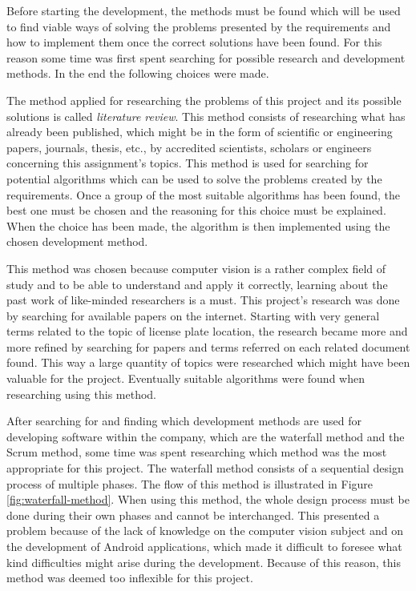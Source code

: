 
Before starting the development, the methods must be found which will be used to find viable ways of solving the problems presented by the requirements and how to implement them once the correct solutions have been found. For this reason some time was first spent searching for possible research and development methods. In the end the following choices were made.


The method applied for researching the problems of this project and its possible solutions is called \emph{literature review}. This method consists of researching what has already been published, which might be in the form of scientific or engineering papers, journals, thesis, etc., by accredited scientists, scholars or engineers concerning this assignment's topics. 
This method is used for searching for potential algorithms which can be used to solve the problems created by the requirements. Once a group of the most suitable algorithms has been found, the best one must be chosen and the reasoning for this choice must be explained. When the choice has been made, the algorithm is then implemented using the chosen development method.

This method was chosen because computer vision is a rather complex field of study and to be able to understand and apply it correctly, learning about the past work of like-minded researchers is a must. This project's research was done by searching for available papers on the internet. Starting with very general terms related to the topic of license plate location, the research became more and more refined by searching for papers and terms referred on each related document found. This way a large quantity of topics were researched which might have been valuable for the project. Eventually suitable algorithms were found when researching using this method.


After searching for and finding which development methods are used for developing software within the company, which are the waterfall method and the Scrum method, some time was spent researching which method was the most appropriate for this project. The waterfall method consists of a sequential design process of multiple phases. The flow of this method is illustrated in Figure \ref{fig:waterfall-method}. When using this method, the whole design process must be done during their own phases and cannot be interchanged. This presented a problem because of the lack of knowledge on the computer vision subject and on the development of Android applications, which made it difficult to foresee what kind difficulties might arise during the development. Because of this reason, this method was deemed too inflexible for this project.

